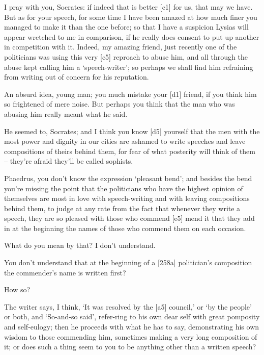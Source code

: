  I pray with you, Socrates: if indeed that is better {[}c1{]}
for us, that may we have. But as for your speech, for some time I have
been amazed at how much finer you managed to make it than the one
before; so that I have a suspicion Lysias will appear wretched to me in
comparison, if he really does consent to put up another in competition
with it. Indeed, my amazing friend, just recently one of the politicians
was using this very {[}c5{]} reproach to abuse him, and all through the
abuse kept calling him a ‘speech-writer'; so perhaps we shall find him
refraining from writing out of concern for his reputation.

 An absurd idea, young man; you much mistake your {[}d1{]}
friend, if you think him so frightened of mere noise. But perhaps you
think that the man who was abusing him really meant what he said.

 He seemed to, Socrates; and I think you know {[}d5{]} yourself
that the men with the most power and dignity in our cities are ashamed
to write speeches and leave compositions of theirs behind them, for fear
of what posterity will think of them -- they're afraid they'll be called
sophists.

 Phaedrus, you don't know the expression ‘pleasant
bend'; and besides the
bend you're missing the point that the politicians who have the highest
opinion of themselves are most in love with speech-writing and with
leaving compositions behind them, to judge at any rate from the fact
that whenever they write a speech, they are so pleased with those who
commend {[}e5{]} mend it that they add in at the beginning the names of
those who commend them on each occasion.

 What do you mean by that? I don't understand.

 You don't understand that at the beginning of a {[}258a{]}
politician's composition the commender's name is written first?

 How so?

 The writer says, I think, ‘It was resolved by the {[}a5{]}
council,' or ‘by the people' or both, and ‘So-and-so said', refer-ring
to his own dear self with great pomposity and self-eulogy; then he
proceeds with what he has to say, demonstrating his own wisdom to those
commending him, sometimes making a very long composition of it; or does
such a thing seem to you to be anything other than a written speech?

